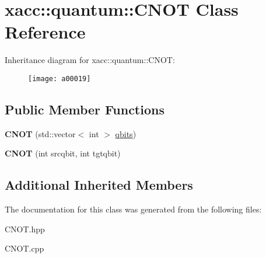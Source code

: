 \hypertarget{a00019}{}\section{xacc\+:\+:quantum\+:\+:C\+N\+OT Class Reference}
\label{a00019}
Inheritance diagram for xacc\+:\+:quantum\+:\+:C\+N\+OT\+:\begin{figure}[H]
\begin{center}
\leavevmode
\texttt{[image: a00019]}
\end{center}
\end{figure}
\subsection*{Public Member Functions}
\begin{DoxyCompactItemize}
\item 
{\bfseries C\+N\+OT} (std\+::vector$<$ int $>$ \hyperlink{a00033_a2a56be6c2519ea65df4d06f4abae1393}{qbits})\hypertarget{a00019_ad3d460779a27affa317dd4f3a88268b3}{}\label{a00019_ad3d460779a27affa317dd4f3a88268b3}

\item 
{\bfseries C\+N\+OT} (int srcqbit, int tgtqbit)\hypertarget{a00019_a15efcb44477dde4b6151fe1776a73ddc}{}\label{a00019_a15efcb44477dde4b6151fe1776a73ddc}

\end{DoxyCompactItemize}
\subsection*{Additional Inherited Members}


The documentation for this class was generated from the following files\+:\begin{DoxyCompactItemize}
\item 
C\+N\+O\+T.\+hpp\item 
C\+N\+O\+T.\+cpp\end{DoxyCompactItemize}
